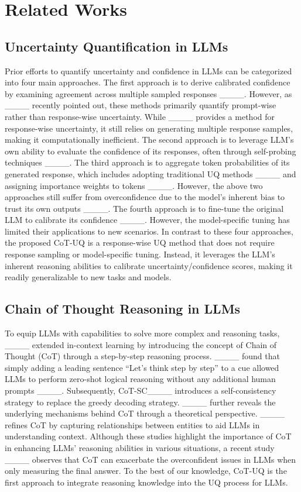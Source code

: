 \section{Related Works}
\subsection{Uncertainty Quantification in LLMs}
Prior efforts to quantify uncertainty and confidence in LLMs can be categorized into four main approaches. The first approach is to derive calibrated confidence by examining agreement across multiple sampled responses ____. However, as ____ recently pointed out, these methods primarily quantify prompt-wise rather than response-wise uncertainty. While ____ provides a method for response-wise uncertainty, it still relies on generating multiple response samples, making it computationally inefficient. The second approach is to leverage LLM's own ability to evaluate the confidence of its responses, often through self-probing techniques ____. The third approach is to aggregate token probabilities of its generated response, which includes adopting traditional UQ methods ____ and assigning importance weights to tokens ____. However, the above two approaches still suffer from overconfidence due to the model’s inherent bias to trust its own outputs ____. The fourth approach is to fine-tune the original LLM to calibrate its confidence ____. However, the model-specific tuning has limited their applications to new scenarios. In contrast to these four approaches, the proposed CoT-UQ is a response-wise UQ method that does not require response sampling or model-specific tuning. Instead, it leverages the LLM’s inherent reasoning abilities to calibrate uncertainty/confidence scores, making it readily generalizable to new tasks and models. 

\subsection{Chain of Thought Reasoning in LLMs}
To equip LLMs with capabilities to solve more complex and reasoning tasks, ____ extended in-context learning by introducing the concept of Chain of Thought (CoT) through a step-by-step reasoning process. ____ found that simply adding a leading sentence “Let’s think step by step” to a cue allowed LLMs to perform zero-shot logical reasoning without any additional human prompts ____. Subsequently, CoT-SC____ introduces a self-consistency strategy to replace the greedy decoding strategy. ____ further reveals the underlying mechanisms behind CoT through a theoretical perspective. ____ refines CoT by capturing relationships between entities to aid LLMs in understanding context. Although these studies highlight the importance of CoT in enhancing LLMs’ reasoning abilities in various situations, a recent study ____ observes that CoT can exacerbate the overconfident issues in LLMs when only measuring the final answer. To the best of our knowledge, CoT-UQ is the first approach to integrate reasoning knowledge into the UQ process for LLMs.